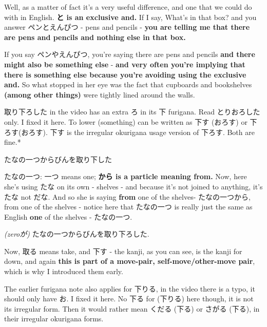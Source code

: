 \thinrule

Well, as a matter of fact it's a very useful difference, and one that we could do with in English. {\bf と is an exclusive and.} If I say, What's in that box? and you answer ペンとえんぴつ - pens and pencils - {\bf you are telling me that there are pens and pencils and nothing else in that box.}

{}

If you say ペンやえんぴつ, you're saying there are pens and pencils {\bf and there might also be something else} - {\bf and very often you're implying that there is something else because you're avoiding using the exclusive and.} So what stopped in her eye was the fact that cupboards and bookshelves {\bf (among other things)} were tightly lined around the walls.

{}

\thinrule

{}

取り下ろした in the video has an extra ろ in its 下 furigana. Read とりおろした only.\crlf
I fixed it here. To lower (something) can be written as 下す (おろす) or 下ろす(おろす).\crlf
下す is the irregular okurigana usage version of 下ろす. Both are fine.*

\stopsectionlevel

\startsectionlevel[title={The most basic use of the から particle},reference={the-most-basic-use-of-the-から-particle}]

たなの一つからびんを取り下した

たなの一つ: 一つ means one; {\bf から is a particle meaning from.} Now, here she's using たな on its own - shelves - and because it's not joined to anything, it's たな not だな. And so she is saying {\bf from} one of the shelves- たなの一つから, from one of the shelves - notice here that たなの一つ is really just the same as English {\bf one} of the shelves - たなの一つ.

{}

{\em (zeroが)} たなの一つからびんを取り下ろした.

Now, 取る means take, and 下す - the kanji, as you can see, is the kanji for down, and again {\bf this is part of a move-pair, self-move/other-move pair},\crlf
which is why I introduced them early.

{}

The earlier furigana note also applies for 下りる, in the video there is a typo, it should only have お. I fixed it here. No 下る for (下りる) here though, it is not its irregular form.\crlf
Then it would rather mean くだる (下る) or さがる (下る), in their irregular okurigana forms.

